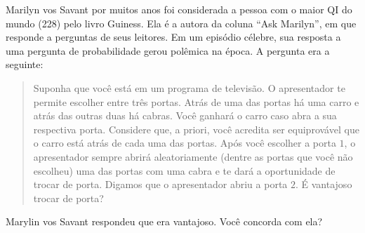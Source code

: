 
\begin{exercise}
 Marilyn vos Savant por muitos anos foi considerada
 a pessoa com o maior QI do mundo (228) pelo
 livro Guiness. Ela é a autora da coluna 
 ``Ask Marilyn'', em que responde a 
 perguntas de seus leitores.
 Em um episódio célebre,
 sua resposta a uma pergunta de probabilidade
 gerou polêmica na época.
 A pergunta era a seguinte:
 \begin{quote}
  Suponha que você está em um programa de televisão.
  O apresentador te permite escolher entre três portas.
  Atrás de uma das portas há uma carro e 
  atrás das outras duas há cabras.
  Você ganhará o carro caso abra a sua respectiva porta.
  Considere que, a priori, você acredita ser
  equiprovável que o carro está atrás de 
  cada uma das portas.
  Após você escolher a porta $1$, o apresentador sempre
  abrirá aleatoriamente (dentre as portas que
  você não escolheu) uma das portas com uma cabra e
  te dará a oportunidade de trocar de porta.
  Digamos que o apresentador abriu a porta $2$.
  É vantajoso trocar de porta?
 \end{quote}

 Marylin vos Savant respondeu que era vantajoso.
 Você concorda com ela?
\end{exercise}

